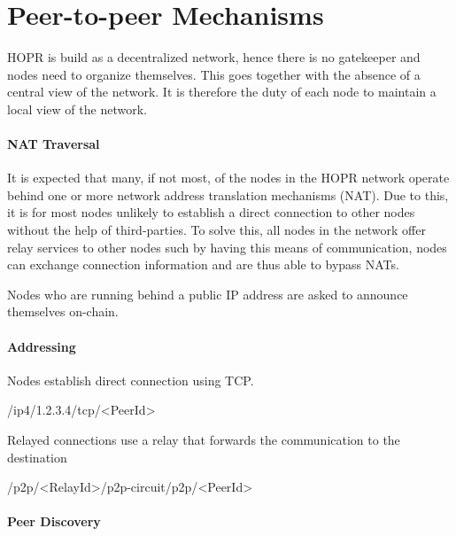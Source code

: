 \section{Peer-to-peer Mechanisms}

HOPR is build as a decentralized network, hence there is no gatekeeper and nodes need to organize themselves. This goes together with the absence of a central view of the network. It is therefore the duty of each node to maintain a local view of the network.

\paragraph{NAT Traversal}

It is expected that many, if not most, of the nodes in the HOPR network operate behind one or more network address translation mechanisms (NAT). Due to this, it is for most nodes unlikely to establish a direct connection to other nodes without the help of third-parties. To solve this, all nodes in the network offer relay services to other nodes such by having this means of communication,
nodes can exchange connection information and are thus able to bypass NATs.

Nodes who are running behind a public IP address are asked to announce themselves on-chain.


\paragraph{Addressing}

Nodes establish direct connection using TCP.

\begin{center}
    \textsf{/ip4/1.2.3.4/tcp/}\textless\textsf{PeerId}\textgreater{}
\end{center}

Relayed connections use a relay that forwards the communication to the destination

\begin{center}
    \textsf{/p2p/}\textless\textsf{RelayId}\textgreater\textsf{/p2p-circuit/p2p/}\textless{}\textsf{PeerId}\textgreater{}
\end{center}

\paragraph{Peer Discovery}

